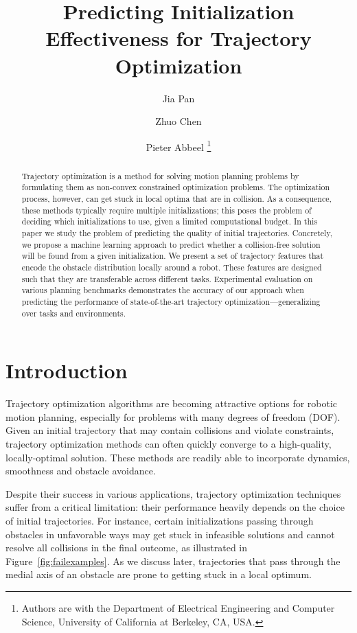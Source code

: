 \documentclass[letterpaper, 10 pt, conference]{ieeeconf}  %
\title{\LARGE \bf
  Predicting Initialization Effectiveness for Trajectory Optimization
}
\author{Jia Pan \and Zhuo Chen \and Pieter Abbeel \thanks{Authors are with the Department of Electrical Engineering and Computer Science, University of California at Berkeley, CA, USA.}}
\begin{document}
\maketitle
\thispagestyle{empty}
\pagestyle{empty}


\begin{abstract}
Trajectory optimization is a method for solving motion planning problems by formulating them as non-convex constrained optimization problems. The optimization process, however, can get stuck in local optima that are in collision. As a consequence, these methods typically require multiple initializations; this poses the problem of deciding which initializations to use, given a limited computational budget. In this paper we study the problem of predicting the quality of initial trajectories. Concretely, we propose a machine learning approach to predict whether a collision-free solution will be found from a given initialization. We present a set of trajectory features that encode the obstacle distribution locally around a robot. These features are designed such that they are transferable across different tasks. Experimental evaluation on various planning benchmarks demonstrates the accuracy of our approach when predicting the performance of state-of-the-art trajectory optimization---generalizing over tasks and environments.
\end{abstract}


\section{Introduction}
Trajectory optimization algorithms are becoming attractive options for robotic motion planning, especially for problems with many degrees of freedom (DOF). Given an initial trajectory that may contain collisions and violate constraints, trajectory optimization methods can often quickly converge to a high-quality, locally-optimal solution. These methods are readily able to incorporate dynamics, smoothness and obstacle avoidance.

Despite their success in various applications, trajectory optimization techniques suffer from a critical limitation: their performance heavily depends on the choice of initial trajectories. For instance, certain initializations passing through obstacles in unfavorable ways may get stuck in infeasible solutions and cannot resolve all collisions in the final outcome, as illustrated in Figure~\ref{fig:failexamples}. As we discuss later, trajectories that pass through the medial axis of an obstacle are prone to getting stuck in a local optimum.
\end{document}
